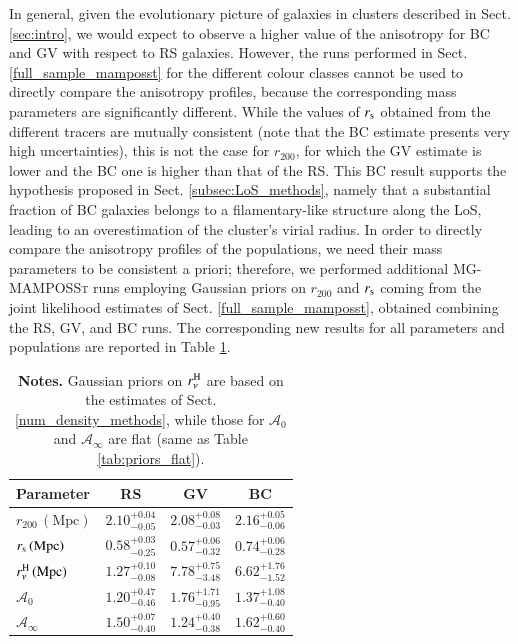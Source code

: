 \documentclass{aa}
\begin{document}
In general, given the evolutionary picture of galaxies in clusters described in Sect. \ref{sec:intro}, we would expect to observe a higher value of the anisotropy for BC and GV with respect to RS galaxies. However, the runs performed in Sect. \ref{full_sample_mamposst} for the different colour classes cannot be used to directly compare the anisotropy profiles, because the corresponding mass parameters are significantly different. While the values of $r_{\rm s}$ obtained from the different tracers are mutually consistent (note that the BC estimate presents very high uncertainties), this is not the case for $r_{200}$, for which the GV estimate is lower and the BC one is higher than that of the RS. This BC result supports the hypothesis proposed in Sect. \ref{subsec:LoS_methods}, namely that a substantial fraction of BC galaxies belongs to a filamentary-like structure along the LoS, leading to an overestimation of the cluster's virial radius. In order to directly compare the anisotropy profiles of the populations, we need their mass parameters to be consistent a priori; therefore, we performed additional \textsc{MG-MAMPOSSt} runs employing Gaussian priors on $r_{200}$ and $r_{\rm s}$ coming from the joint likelihood estimates of Sect. \ref{full_sample_mamposst}, obtained combining the RS, GV, and BC runs. The corresponding new results for all parameters and populations are reported in Table \ref{tab:diff_samples_results_withpriors}.
\begin{table}
\centering
\caption{Same as Table \ref{tab:diff_samples_results}, but for the runs with Gaussian priors on $r_{200}$ and $r_{\rm{s}}$ from the joint likelihood.}
\renewcommand{\arraystretch}{1.3}
\begin{tabular}{lccc}
\hline
{Parameter} & {RS} & {GV} & {BC} \\
\hline
       
       $r_{200} \, (\mathrm{Mpc})$ & $2.10_{-0.05}^{+0.04}$ & $2.08_{-0.03}^{+0.08}$ & $2.16_{-0.06}^{+0.05}$ \\
       $r_{\rm s} \, (\mathrm{Mpc})$ & $0.58_{-0.25}^{+0.03}$ & $0.57_{-0.32}^{+0.06}$ & $0.74_{-0.28}^{+0.06}$ \\
       $r_\nu^{\rm H} \, (\mathrm{Mpc})$ & $1.27_{-0.08}^{+0.10}$ & $7.78_{-3.48}^{+0.75}$ & $6.62_{-1.52}^{+1.76}$ \\
       $\mathcal{A}_0$ & 
       $1.20_{-0.46}^{+0.47}$ & $1.76_{-0.95}^{+1.71}$ & $1.37_{-0.40}^{+1.08}$ \\
       $\mathcal{A}_\infty$ & $1.50_{-0.40}^{+0.07}$ & $1.24_{-0.38}^{+0.40}$ & $1.62_{-0.40}^{+0.60}$ \\
          
\hline
\end{tabular}
\caption*{\footnotesize \textbf{Notes.} Gaussian priors on $r_\nu^{\rm H}$ are based on the estimates of Sect. \ref{num_density_methods}, while those for $\mathcal{A}_0$ and $\mathcal{A}_\infty$ are flat (same as Table \ref{tab:priors_flat}).}
\label{tab:diff_samples_results_withpriors}
\end{table}
\end{document}
